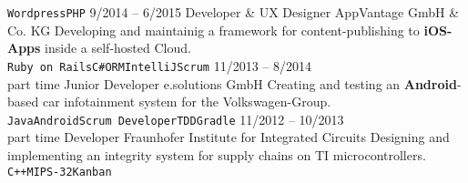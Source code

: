 \documentclass[9pt]{developercv} %
\begin{document}
\begin{entrylist}
{      \texttt{Wordpress}\slashsep\texttt{PHP}
    }
  \entry
		{9/2014 -- 6/2015}
		{Developer \& UX Designer}
		{AppVantage GmbH \& Co. KG}
		{
      Developing and maintainig a framework for content-publishing to \textbf{iOS-Apps} inside a self-hosted Cloud.\\
      \texttt{Ruby on Rails}\slashsep\texttt{C\#}\slashsep\texttt{ORM}\slashsep\texttt{IntelliJ}\slashsep\texttt{Scrum}
    }
  \entry
		{11/2013 -- 8/2014\\\footnotesize{part time}}
		{Junior Developer}
		{e.solutions GmbH}
		{
      Creating and testing an \textbf{Android}-based car infotainment system for the Volkswagen-Group.\\
      \texttt{Java}\slashsep\texttt{Android}\slashsep\texttt{Scrum Developer}\slashsep\texttt{TDD}\slashsep\texttt{Gradle}
    }
  \entry
		{11/2012 -- 10/2013\\\footnotesize{part time}}
		{Developer}
		{Fraunhofer Institute for Integrated Circuits}
		{
      Designing and implementing an integrity system for supply chains on TI microcontrollers.\\
      \texttt{C++}\slashsep\texttt{MIPS-32}\slashsep\texttt{Kanban}
    }
\end{entrylist}
\vspace{0.8cm}


\end{document}
